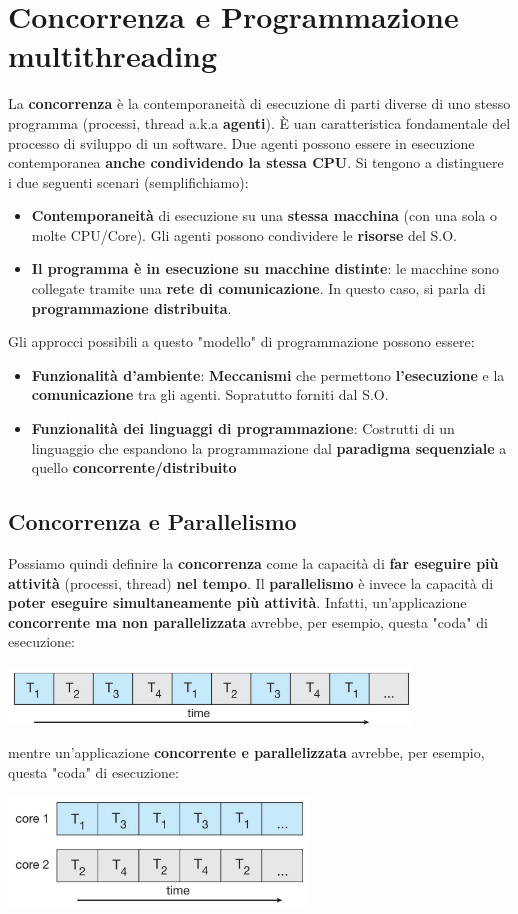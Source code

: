 \documentclass[12pt]{article}
\begin{document}
\section{Concorrenza e Programmazione multithreading}
La \textbf{concorrenza} è la contemporaneità di esecuzione di parti diverse di uno stesso programma (processi, thread a.k.a \textbf{agenti}). È uan caratteristica fondamentale del processo di sviluppo di un software. Due agenti possono essere in esecuzione contemporanea \textbf{anche condividendo la stessa CPU}. Si tengono a distinguere i due seguenti scenari (semplifichiamo):
\begin{itemize}
    \item \textbf{Contemporaneità} di esecuzione su una \textbf{stessa macchina} (con una sola o molte CPU/Core). Gli agenti possono condividere le \textbf{risorse} del S.O.
    \item \textbf{Il programma è in esecuzione su macchine distinte}: le macchine sono collegate tramite una \textbf{rete di comunicazione}. In questo caso, si parla di \textbf{programmazione distribuita}.
\end{itemize}
Gli approcci possibili a questo "modello" di programmazione possono essere:
\begin{itemize}
    \item \textbf{Funzionalità d'ambiente}: \textbf{Meccanismi} che permettono \textbf{l'esecuzione} e la \textbf{comunicazione} tra gli agenti. Sopratutto forniti dal S.O.
    \item \textbf{Funzionalità dei linguaggi di programmazione}: Costrutti di un linguaggio che espandono la programmazione dal \textbf{paradigma sequenziale} a quello \textbf{concorrente/distribuito}
\end{itemize}
\subsection{Concorrenza e Parallelismo}
Possiamo quindi definire la \textbf{concorrenza} come la capacità di \textbf{far eseguire più attività} (processi, thread) \textbf{nel tempo}. Il \textbf{parallelismo} è invece la capacità di \textbf{poter eseguire simultaneamente più attività}. Infatti, un'applicazione \textbf{concorrente ma non parallelizzata} avrebbe, per esempio, questa "coda" di esecuzione:
\begin{center}
    \includegraphics[width = 0.80\textwidth]{Images/45.png}
\end{center}
mentre un'applicazione \textbf{concorrente e parallelizzata} avrebbe, per esempio, questa "coda" di esecuzione:
\begin{center}
    \includegraphics[width = 0.60\textwidth]{Images/46.png}
\end{center}
\end{document}
